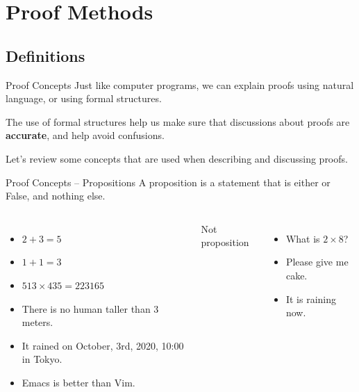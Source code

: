 \section{Proof Methods}




\subsection{Definitions}

\begin{frame}[t]{Proof Concepts}
  Just like computer programs, we can explain proofs using natural language, or using formal structures.\bigskip 

  The use of formal structures help us make sure that discussions about proofs are {\bf accurate}, and help avoid confusions.\bigskip

  Let's review some concepts that are used when describing and discussing proofs.

\end{frame}

\begin{frame}{Proof Concepts -- Propositions}
  A proposition is a statement that is either  or \alert{False}, and nothing else.\bigskip

  \begin{columns}[T]
    \begin{itemize}
      \item $2 + 3 = 5$
      \item $1 + 1 = 3$
      \item $513 \times 435 = 223165$
      \item There is no human taller than 3 meters.
      \item It rained on October, 3rd, 2020, 10:00 in Tokyo.
      \item Emacs is better than Vim.
    \end{itemize}
    \alert{Not proposition}
    \begin{itemize}
      \item What is $2 \times 8$?
      \item Please give me cake.
      \item It is raining now.
    \end{itemize}
  \end{columns}
\end{frame}

